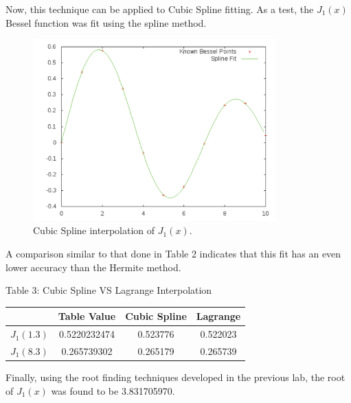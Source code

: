 \documentclass[12pt]{article}
\begin{document}
Now, this technique can be applied to Cubic Spline fitting.  As a test, the $J_1(x)$ Bessel function was fit using the spline method.
\begin{figure}[!h]
\centering
\includegraphics[width =120 mm, height = 70mm]{Ex_3_6.pdf}
\caption{Cubic Spline interpolation of $J_1(x)$.}
\label{fig:3.6}
\end{figure}
A comparison similar to that done in Table 2 indicates that this fit has an even lower accuracy than the Hermite method.  
\begin{center}
Table 3:  Cubic Spline VS Lagrange Interpolation \\
\begin{tabular}{ | c | c | c | c |}
\hline
 & Table Value & Cubic Spline & Lagrange  \\ \hline
$J_1(1.3)$ & 0.5220232474 & 0.523776 & 0.522023 \\ \hline
$J_1(8.3)$ & 0.265739302 & 0.265179 & 0.265739 \\ \hline
\end{tabular}
\end{center}
Finally, using the root finding techniques developed in the previous lab, the root of $J_1(x)$ was found to be 3.831705970.
\end{document}
